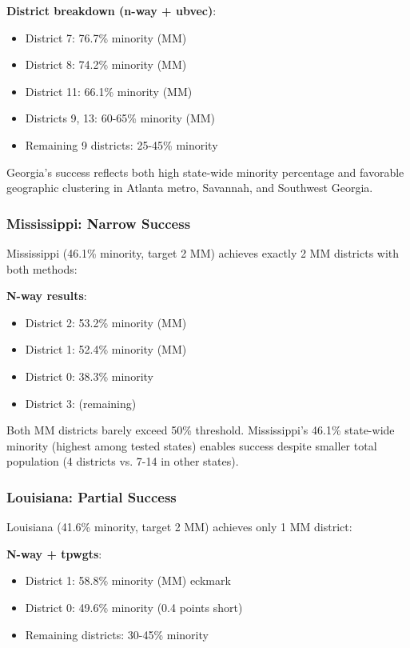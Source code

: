 \textbf{District breakdown (n-way + ubvec)}:
\begin{itemize}
\item District 7: 76.7\% minority (MM)
\item District 8: 74.2\% minority (MM)
\item District 11: 66.1\% minority (MM)
\item Districts 9, 13: 60-65\% minority (MM)
\item Remaining 9 districts: 25-45\% minority
\end{itemize}

Georgia's success reflects both high state-wide minority percentage and favorable geographic clustering in Atlanta metro, Savannah, and Southwest Georgia.

\subsubsection{Mississippi: Narrow Success}

Mississippi (46.1\% minority, target 2 MM) achieves exactly 2 MM districts with both methods:

\textbf{N-way results}:
\begin{itemize}
\item District 2: 53.2\% minority (MM)
\item District 1: 52.4\% minority (MM)
\item District 0: 38.3\% minority
\item District 3: (remaining)
\end{itemize}

Both MM districts barely exceed 50\% threshold. Mississippi's 46.1\% state-wide minority (highest among tested states) enables success despite smaller total population (4 districts vs. 7-14 in other states).

\subsubsection{Louisiana: Partial Success}

Louisiana (41.6\% minority, target 2 MM) achieves only 1 MM district:

\textbf{N-way + tpwgts}:
\begin{itemize}
\item District 1: 58.8\% minority (MM)  eckmark
\item District 0: 49.6\% minority (0.4 points short)
\item Remaining districts: 30-45\% minority
\end{itemize}

